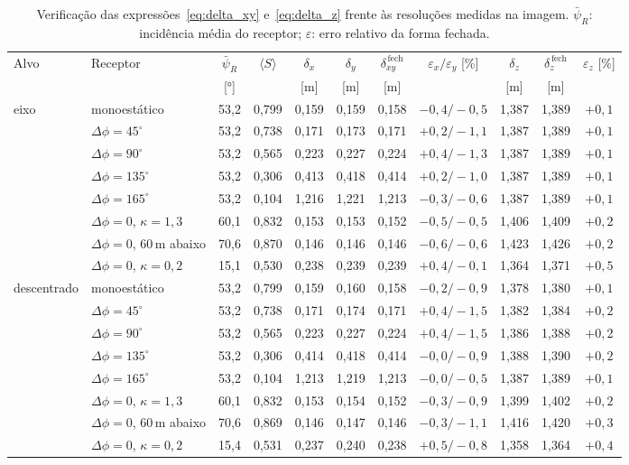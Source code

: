 \documentclass[12pt,a4paper,oneside]{book}
\theoremstyle{remark}
\theoremstyle{plain}
\theoremstyle{definition}
\begin{document}
\begin{table}[H]
\centering\footnotesize\setlength{\tabcolsep}{3.4pt}
\caption{Verificação das expressões~\eqref{eq:delta_xy} e~\eqref{eq:delta_z}
frente às resoluções medidas na imagem. $\bar\psi_R$: incidência média do
receptor; $\varepsilon$: erro relativo da forma fechada.}
\label{tab:res_verif}
\begin{tabular}{@{}llccccccccc@{}}
\toprule
Alvo & Receptor & $\bar\psi_R$ & $\langle S\rangle$ & $\delta_x$ & $\delta_y$ & $\delta_{xy}^{\,\mathrm{fech}}$ & $\varepsilon_x/\varepsilon_y$ [\%] & $\delta_z$ & $\delta_z^{\,\mathrm{fech}}$ & $\varepsilon_z$ [\%] \\
 & & [°] & & [m] & [m] & [m] & & [m] & [m] & \\
\midrule
eixo & monoestático & 53,2 & 0,799 & 0,159 & 0,159 & 0,158 & $-0,4/-0,5$ & 1,387 & 1,389 & $+0,1$ \\
 & $\Delta\phi=45^{\circ}$ & 53,2 & 0,738 & 0,171 & 0,173 & 0,171 & $+0,2/-1,1$ & 1,387 & 1,389 & $+0,1$ \\
 & $\Delta\phi=90^{\circ}$ & 53,2 & 0,565 & 0,223 & 0,227 & 0,224 & $+0,4/-1,3$ & 1,387 & 1,389 & $+0,1$ \\
 & $\Delta\phi=135^{\circ}$ & 53,2 & 0,306 & 0,413 & 0,418 & 0,414 & $+0,2/-1,0$ & 1,387 & 1,389 & $+0,1$ \\
 & $\Delta\phi=165^{\circ}$ & 53,2 & 0,104 & 1,216 & 1,221 & 1,213 & $-0,3/-0,6$ & 1,387 & 1,389 & $+0,1$ \\
 & $\Delta\phi=0$, $\kappa=1,3$ & 60,1 & 0,832 & 0,153 & 0,153 & 0,152 & $-0,5/-0,5$ & 1,406 & 1,409 & $+0,2$ \\
 & $\Delta\phi=0$, $60\,$m abaixo & 70,6 & 0,870 & 0,146 & 0,146 & 0,146 & $-0,6/-0,6$ & 1,423 & 1,426 & $+0,2$ \\
 & $\Delta\phi=0$, $\kappa=0,2$ & 15,1 & 0,530 & 0,238 & 0,239 & 0,239 & $+0,4/-0,1$ & 1,364 & 1,371 & $+0,5$ \\
\midrule
descentrado & monoestático & 53,2 & 0,799 & 0,159 & 0,160 & 0,158 & $-0,2/-0,9$ & 1,378 & 1,380 & $+0,1$ \\
 & $\Delta\phi=45^{\circ}$ & 53,2 & 0,738 & 0,171 & 0,174 & 0,171 & $+0,4/-1,5$ & 1,382 & 1,384 & $+0,2$ \\
 & $\Delta\phi=90^{\circ}$ & 53,2 & 0,565 & 0,223 & 0,227 & 0,224 & $+0,4/-1,5$ & 1,386 & 1,388 & $+0,2$ \\
 & $\Delta\phi=135^{\circ}$ & 53,2 & 0,306 & 0,414 & 0,418 & 0,414 & $-0,0/-0,9$ & 1,388 & 1,390 & $+0,2$ \\
 & $\Delta\phi=165^{\circ}$ & 53,2 & 0,104 & 1,213 & 1,219 & 1,213 & $-0,0/-0,5$ & 1,387 & 1,389 & $+0,1$ \\
 & $\Delta\phi=0$, $\kappa=1,3$ & 60,1 & 0,832 & 0,153 & 0,154 & 0,152 & $-0,3/-0,9$ & 1,399 & 1,402 & $+0,2$ \\
 & $\Delta\phi=0$, $60\,$m abaixo & 70,6 & 0,869 & 0,146 & 0,147 & 0,146 & $-0,3/-1,1$ & 1,416 & 1,420 & $+0,3$ \\
 & $\Delta\phi=0$, $\kappa=0,2$ & 15,4 & 0,531 & 0,237 & 0,240 & 0,238 & $+0,5/-0,8$ & 1,358 & 1,364 & $+0,4$ \\
\bottomrule
\end{tabular}
\end{table}
\end{document}
